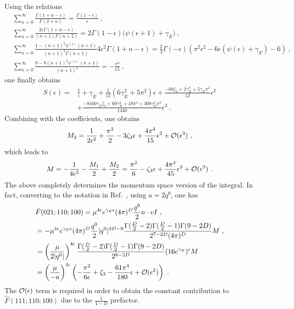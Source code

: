 \documentclass[a4paper,11pt]{article}
\begin{document}
Using the relations
\begin{align}
&\sum_{n=0}^{\infty}\frac{\Gamma(1+n-\epsilon)}{\Gamma(2+n)}=\frac{\Gamma(1-\epsilon)}{\epsilon} \ , \\ 
&\sum_{n=0}^{\infty}\frac{2\epsilon\Gamma(1+n-\epsilon)}{(n+1)\Gamma(n+2)}=2 \Gamma (1-\epsilon) \bigg(\psi(\epsilon+1)+\gamma_E \bigg) \ , \\ 
&\sum_{n=0}^{\infty}\frac{1- (n+1)^2 \psi ^{(1)}(n+1)}{(n+1)^3 \Gamma (n+1)}4\epsilon^2\Gamma(1+n-\epsilon)=\frac{2}{3} \Gamma (-\epsilon) \left(\pi ^2 \epsilon^2-6 \epsilon(\psi(\epsilon)+\gamma_E )-6\right) \ , \\
&\sum_{n=0}^{\infty}\frac{8-8 (n+1)^2 \psi ^{(1)}(n+1)}{(n+1)^4} =-\frac{\pi^4}{15} \ ,
\end{align}
one finally obtains
\begin{align}
S(\epsilon)=&\frac{1}{\epsilon}+\gamma_E+\frac{1}{12}\left(6\gamma_E^2+5\pi^2\right)\epsilon+\frac{-68 \zeta_3+2 \gamma_E ^3+5 \gamma_E  \pi ^2}{12}\epsilon^2\nonumber \\ 
&+\frac{-8160 \gamma_E  \zeta_3+60 \gamma_E ^4+49 \pi ^4+300 \gamma_E ^2 \pi ^2}{1440}\epsilon^3 \ .
\end{align}
Combining with the coefficients, one obtains
\begin{align}
M_2=\frac{1}{2\epsilon^2}+\frac{\pi^2}{2}-3\zeta_3\epsilon+\frac{4\pi^4}{15}\epsilon^2+{\cal O}(\epsilon^3) \ , 
\end{align}
which leads to
\begin{align}
M=-\frac{1}{4\epsilon^2}-\frac{M_1}{2}+\frac{M_2}{2}=\frac{\pi^2}{6}-\zeta_3\epsilon+\frac{4\pi^4}{45}\epsilon^2+{\cal O}(\epsilon^3) \ .
\end{align}
The above completely determines the momentum space version of the integral. 
In fact, converting to the notation in Ref.~\cite{Jain:2008gb}, using $a=2q^0$, one has
\begin{align}
&\hat F(021;110;100)=\mu^{4\epsilon}e^{\gamma_E\epsilon}(4\pi)^D \frac{q^0}{2}n\cdot v I \ , \\ 
&=-\mu^{4\epsilon}e^{\gamma_E\epsilon}(4\pi)^D \frac{q^0}{2}|q^0|^{2D-9}\frac{\Gamma(\frac{D}{2}-2)\Gamma(\frac{D}{2}-1)\Gamma(9-2D)}{2^{7-2D}(4\pi)^D}M \ , \\ 
&=\left(\frac{\mu}{2|q^0|}\right)^{4\epsilon}\frac{\Gamma(\frac{D}{2}-2)\Gamma(\frac{D}{2}-1)\Gamma(9-2D)}{2^{8-2D}}(16e^{\gamma_E})^{\epsilon}M \nonumber \\ 
&=\left(\frac{\mu}{-a}\right)^{4\epsilon}\left(-\frac{\pi^2}{6\epsilon}+\zeta_3-\frac{61\pi^4}{180}\epsilon+{\cal O}(\epsilon^2)\right) \ .
\end{align}
 The ${\cal O}(\epsilon)$ term is required in order to obtain the constant contribution to $\hat F(111;110;100)$ due to the $\frac{1}{4-D}$ prefactor.
  
\end{document}
